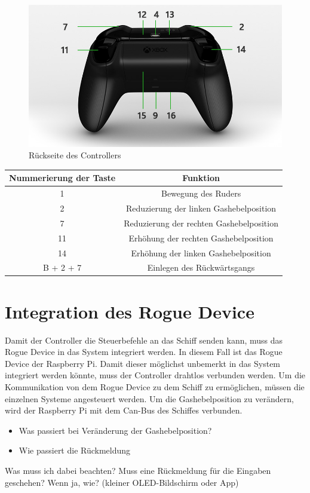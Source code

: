 \begin{figure}[H]
    \centering
    \includegraphics[scale=0.5]{images/rueckseite.jpg}
    \caption{Rückseite des Controllers}
    \label{fig:rueckseite}
\end{figure}

\begin{table}[H]
    \begin{tabular}{|c|c|}
    \hline
    \rowcolor[gray]{0.8}
     Nummerierung der Taste & Funktion \\ \hline 
     1 & Bewegung des Ruders \\ \hline 
     2 & Reduzierung der linken Gashebelposition \\ \hline 
     7 & Reduzierung der rechten Gashebelposition \\ \hline
     11 & Erhöhung der rechten Gashebelposition \\ \hline
     14 & Erhöhung der linken Gashebelposition \\ \hline
     B + 2 + 7 & Einlegen des Rückwärtsgangs \\ \hline
    \end{tabular}
\end{table}

\section{Integration des Rogue Device}
Damit der Controller die Steuerbefehle an das Schiff senden kann, muss das Rogue Device in das System integriert werden.
In diesem Fall ist das Rogue Device der Raspberry Pi. Damit dieser möglichst unbemerkt in das System integriert werden könnte,
muss der Controller drahtlos verbunden werden. Um die Kommunikation von dem Rogue Device zu dem Schiff zu ermöglichen, müssen
die einzelnen Systeme angesteuert werden. Um die Gashebelposition zu verändern, wird der Raspberry Pi mit dem Can-Bus des Schiffes
verbunden. 
\\
\begin{itemize}
    \item Was passiert bei Veränderung der Gashebelposition?
    \item Wie passiert die Rückmeldung
\end{itemize}
Was muss ich dabei beachten?
Muss eine Rückmeldung für die Eingaben geschehen? Wenn ja, wie?
(kleiner OLED-Bildschirm oder App)

